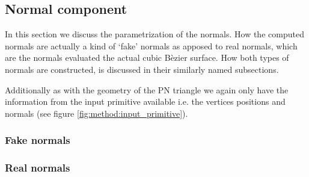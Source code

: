 
\subsection{Normal component}\label{ss:normal_component}
In this section we discuss the parametrization of the normals. How the computed normals are actually a kind of `fake' normals as apposed to real normals, which are the normals evaluated the actual cubic B\`ezier surface. How both types of normals are constructed, is discussed in their similarly named subsections. 

Additionally as with the geometry of the PN triangle we again only have the information from the input primitive available i.e. the vertices positions and normals (see figure \ref{fig:method:input_primitive}).



\subsubsection{Fake normals}
\label{sss:method:normals:fakeNormals}

\subsubsection{Real normals}
\label{sss:method:normals:realNormals}
